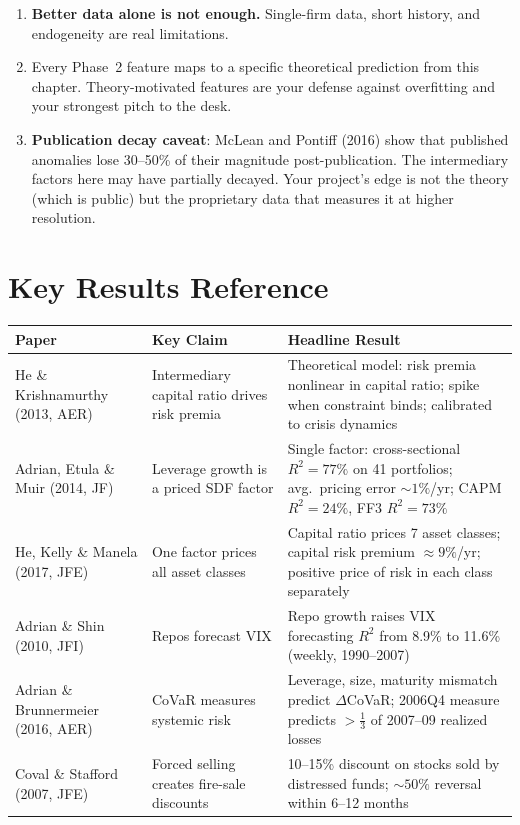 \begin{enumerate}[nosep]
  \item \textbf{Better data alone is not enough.} Single-firm data, short history, and endogeneity are real limitations.
  \item Every Phase~2 feature maps to a specific theoretical prediction from this chapter. Theory-motivated features are your defense against overfitting and your strongest pitch to the desk.
  \item \textbf{Publication decay caveat}: McLean and Pontiff (2016) show that published anomalies lose 30--50\% of their magnitude post-publication. The intermediary factors here may have partially decayed. Your project's edge is not the theory (which is public) but the proprietary data that measures it at higher resolution.
\end{enumerate}

\section*{Key Results Reference}
\label{sec:ch2-key-results}

\begin{center}
\begin{tabular}{p{3.5cm} p{3.5cm} p{6.5cm}}
\toprule
\textbf{Paper} & \textbf{Key Claim} & \textbf{Headline Result} \\
\midrule
He \& Krishnamurthy (2013, AER) & Intermediary capital ratio drives risk premia & Theoretical model: risk premia nonlinear in capital ratio; spike when constraint binds; calibrated to crisis dynamics \\
\addlinespace
Adrian, Etula \& Muir (2014, JF) & Leverage growth is a priced SDF factor & Single factor: cross-sectional $R^2 = 77\%$ on 41 portfolios; avg.\ pricing error ${\sim}1\%$/yr; CAPM $R^2 = 24\%$, FF3 $R^2 = 73\%$ \\
\addlinespace
He, Kelly \& Manela (2017, JFE) & One factor prices all asset classes & Capital ratio prices 7 asset classes; capital risk premium ${\approx}9\%$/yr; positive price of risk in each class separately \\
\addlinespace
Adrian \& Shin (2010, JFI) & Repos forecast VIX & Repo growth raises VIX forecasting $R^2$ from 8.9\% to 11.6\% (weekly, 1990--2007) \\
\addlinespace
Adrian \& Brunnermeier (2016, AER) & CoVaR measures systemic risk & Leverage, size, maturity mismatch predict $\Delta$CoVaR; 2006Q4 measure predicts ${>}\frac{1}{3}$ of 2007--09 realized losses \\
\addlinespace
Coval \& Stafford (2007, JFE) & Forced selling creates fire-sale discounts & 10--15\% discount on stocks sold by distressed funds; ${\sim}50\%$ reversal within 6--12 months \\
\bottomrule
\end{tabular}
\end{center}
